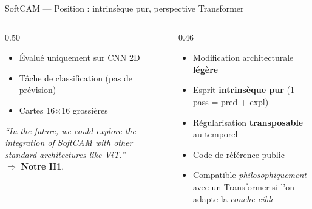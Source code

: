 \documentclass[10pt]{beamer}
\begin{document}
\begin{frame}{SoftCAM — Position : intrinsèque pur, perspective Transformer}
  \begin{columns}
    \begin{column}{0.50\textwidth}
      \begin{tcolorbox}[colback=red!3, colframe=red!60!black, arc=2mm,
                        fonttitle=\bfseries, title=Limites encore à résoudre]
        \begin{itemize}
          \item Évalué uniquement sur CNN 2D
          \item Tâche de classification (pas de prévision)
          \item Cartes 16$\times$16 grossières
        \end{itemize}
      \end{tcolorbox}
      \begin{tcolorbox}[colback=blue!3, colframe=blue!50!black, arc=2mm,
                        fonttitle=\bfseries, title=Citation des auteurs (p. 10)]
        \emph{``In the future, we could explore the integration of SoftCAM with other standard architectures like ViT.''}\\[2pt]
        $\Rightarrow$ \textbf{Notre H1}.
      \end{tcolorbox}
    \end{column}
    \begin{column}{0.46\textwidth}
      \begin{tcolorbox}[colback=newcontrib!5, colframe=newcontrib!70!black, arc=2mm,
                        fonttitle=\bfseries, title=Pourquoi c'est le bon point de départ pour FAYAM]
        \begin{itemize}
          \item Modification architecturale \textbf{légère}
          \item Esprit \textbf{intrinsèque pur} (1 pass = pred + expl)
          \item Régularisation \textbf{transposable} au temporel
          \item Code de référence public
          \item Compatible \emph{philosophiquement} avec un Transformer si l'on adapte la \emph{couche cible}
        \end{itemize}
      \end{tcolorbox}
    \end{column}
  \end{columns}
\end{frame}
\end{document}
